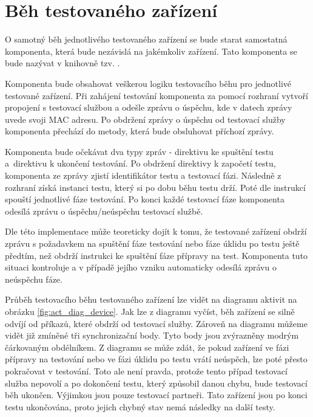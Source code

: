 \section{Běh testovaného zařízení}

O samotný běh jednotlivého testovaného zařízení se bude starat samostatná komponenta, která bude nezávislá na jakémkoliv zařízení. Tato komponenta se bude nazývat v knihovně tzv. .

Komponenta bude obsahovat veškerou logiku testovacího běhu pro jednotlivé testované zařízení. Při zahájení testování komponenta za pomocí rozhraní vytvoří propojení s testovací službou a odešle zprávu o úspěchu, kde v datech zprávy uvede svoji MAC adresu. Po obdržení zprávy o úspěchu od testovací služby komponenta přechází do metody, která bude obsluhovat příchozí zprávy. 

Komponenta bude očekávat dva typy zpráv - direktivu ke spuštění testu a~direktivu k ukončení testování. Po obdržení direktivy k započetí testu, komponenta ze zprávy zjistí identifikátor testu a testovací fázi. Následně z rozhraní získá instanci testu, který si po dobu běhu testu drží. Poté dle instrukcí spouští jednotlivé fáze testování. Po konci každé testovací fáze komponenta odesílá zprávu o úspěchu/neúspěchu testovací službě.

Dle této implementace může teoreticky dojít k tomu, že testované zařízení obdrží zprávu s požadavkem na spuštění fáze testování nebo fáze úklidu po testu ještě předtím, než obdrží instrukci ke spuštění fáze přípravy na test. Komponenta tuto situaci kontroluje a v případě jejího vzniku automaticky odesílá zprávu o neúspěchu fáze. 

Průběh testovacího běhu testovaného zařízení lze vidět na diagramu aktivit na obrázku \ref{fig:act_diag_device}. Jak lze z diagramu vyčíst, běh zařízení se silně odvíjí od příkazů, které obdrží od testovací služby. Zároveň na diagramu můžeme vidět již zmíněné tři synchronizační body. Tyto body jsou zvýrazněny modrým čárkovaným obdélníkem. Z diagramu se může zdát, že pokud zařízení ve fázi přípravy na testování nebo ve fázi úklidu po testu vrátí neúspěch, lze poté přesto pokračovat v testování. Toto ale není pravda, protože tento případ testovací služba nepovolí a po dokončení testu, který způsobil danou chybu, bude testovací běh ukončen. Výjimkou jsou pouze testovací partneři. Tato zařízení jsou po konci testu ukončována, proto jejich chybný stav nemá následky na další testy.

